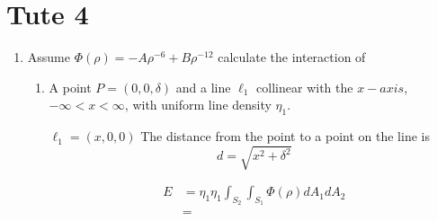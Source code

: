 \documentclass{E:/Documents/Latex/myassignment}
\begin{document}
\section{Tute 4}
\begin{enumerate}
	\item Assume $\Phi(\rho) = -A \rho^{-6} + B \rho^{-12}$ calculate the interaction of
	\begin{enumerate}
		\item A point $P = (0,0,\delta)$ and a line $\ell_1$ collinear with the $x-axis$, $-\infty < x < \infty$, with uniform line density $\eta_1$.

		$\ell_1 = (x,0,0)$
		The distance from the point to a point on the line is 
		\[d = \sqrt{x^2 + \delta^2}\]

		\begin{align*}
			E &= \eta_1\eta_1 \int_{S_2} \int_{S_1} \Phi(\rho) dA_1 dA_2\\
			&=
		\end{align*}


\end{enumerate}
\end{enumerate}
\end{document}
